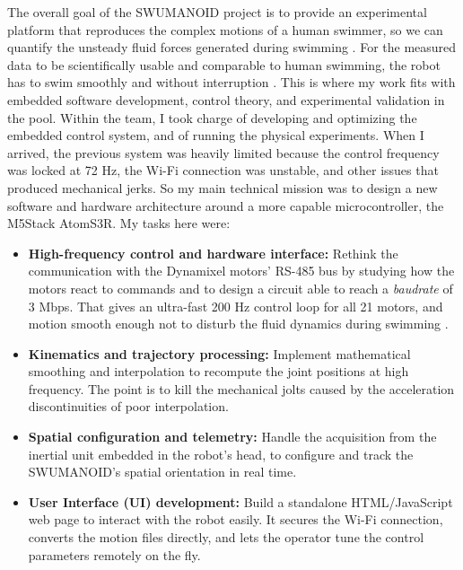 \documentclass{tropLaClasse}
\begin{document}
The overall goal of the SWUMANOID project is to provide an experimental platform that reproduces the complex motions of a human swimmer, so we can quantify the unsteady fluid forces generated during swimming \cite{chung2013free, chung2014swimming}. For the measured data to be scientifically usable and comparable to human swimming, the robot has to swim smoothly and without interruption \cite{chung2013free, chung2014swimming}. This is where my work fits with embedded software development, control theory, and experimental validation in the pool. Within the team, I took charge of developing and optimizing the embedded control system, and of running the physical experiments. When I arrived, the previous system was heavily limited because the control frequency was locked at 72 Hz, the Wi-Fi connection was unstable, and other issues that produced mechanical jerks. So my main technical mission was to design a new software and hardware architecture around a more capable microcontroller, the M5Stack AtomS3R. My tasks here were:

\begin{itemize}
    \item \textbf{High-frequency control and hardware interface:} Rethink the communication with the Dynamixel motors' RS-485 bus by studying how the motors react to commands and to design a circuit able to reach a \textit{baudrate} of 3 Mbps. That gives an ultra-fast 200 Hz control loop for all 21 motors, and motion smooth enough not to disturb the fluid dynamics during swimming \cite{chung2014swimming}.
    \item \textbf{Kinematics and trajectory processing:} Implement mathematical smoothing and interpolation to recompute the joint positions at high frequency. The point is to kill the mechanical jolts caused by the acceleration discontinuities of poor interpolation.
    \item \textbf{Spatial configuration and telemetry:} Handle the acquisition from the inertial unit embedded in the robot's head, to configure and track the SWUMANOID's spatial orientation in real time.
    \item \textbf{User Interface (UI) development:} Build a standalone HTML/JavaScript web page to interact with the robot easily. It secures the Wi-Fi connection, converts the motion files directly, and lets the operator tune the control parameters remotely on the fly.
\end{itemize}


\end{document}
